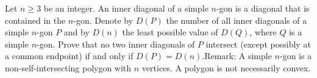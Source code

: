 Let $n\ge 3$ be an integer. An inner diagonal of a simple $n$-gon is a diagonal that is contained in the $n$-gon. Denote by $D(P)$ the number of all inner diagonals of a simple $n$-gon $P$ and by $D(n)$ the least possible value of $D(Q)$,  where $Q$ is a simple $n$-gon. Prove that no two inner diagonals of $P$ intersect (except possibly at a common endpoint) if and only if $D(P)=D(n)$.Remark: A simple $n$-gon is a non-self-intersecting polygon with $n$ vertices. A polygon is not necessarily convex.